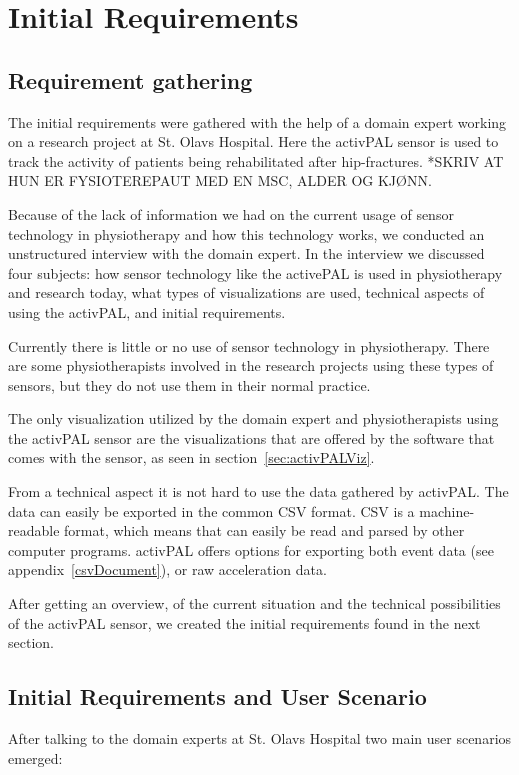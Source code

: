 \chapter{Initial Requirements}
\label{ch:initialRequirements}

\section{Requirement gathering}
The initial requirements were gathered with the help of a domain expert working on a research project at St. Olavs Hospital. Here the activPAL sensor is used to track the activity of patients being rehabilitated after hip-fractures. *SKRIV AT HUN ER FYSIOTEREPAUT MED EN MSC, ALDER OG KJØNN.

Because of the lack of information we had on the current usage of sensor technology in physiotherapy and how this technology works, we conducted an unstructured interview with the domain expert. In the interview we discussed four subjects: how sensor technology like the activePAL is used in physiotherapy and research today, what types of visualizations are used, technical aspects of using the activPAL, and initial requirements. 

Currently there is little or no use of sensor technology in physiotherapy. There are some physiotherapists involved in the research projects using these types of sensors, but they do not use them in their normal practice. 

The only visualization utilized by the domain expert and physiotherapists using the activPAL sensor are the visualizations that are offered by the software that comes with the sensor, as seen in section~\ref{sec:activPALViz}.

From a technical aspect it is not hard to use the data gathered by activPAL. The data can easily be exported in the common CSV format. CSV is a machine-readable format, which means that can easily be read and parsed by other computer programs. activPAL offers options for exporting both event data (see appendix~\ref{csvDocument}), or raw acceleration data.

After getting an overview, of the current situation and the technical possibilities of the activPAL sensor, we created the initial requirements found in the next section.

\section{Initial Requirements and User Scenario}
After talking to the domain experts at St. Olavs Hospital two main user scenarios emerged:

